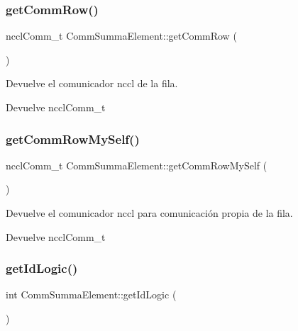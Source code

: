 \subsubsection{\texorpdfstring{get\+Comm\+Row()}{getCommRow()}}
{\footnotesize\ttfamily nccl\+Comm\+\_\+t Comm\+Summa\+Element\+::get\+Comm\+Row (\begin{DoxyParamCaption}{ }\end{DoxyParamCaption})}



Devuelve el comunicador nccl de la fila. 

\begin{DoxyReturn}{Devuelve}
nccl\+Comm\+\_\+t 
\end{DoxyReturn}
\mbox{\label{classCommSummaElement_a1fc217055366930113af68024e634f83}} 
\subsubsection{\texorpdfstring{get\+Comm\+Row\+My\+Self()}{getCommRowMySelf()}}
{\footnotesize\ttfamily nccl\+Comm\+\_\+t Comm\+Summa\+Element\+::get\+Comm\+Row\+My\+Self (\begin{DoxyParamCaption}{ }\end{DoxyParamCaption})}



Devuelve el comunicador nccl para comunicación propia de la fila. 

\begin{DoxyReturn}{Devuelve}
nccl\+Comm\+\_\+t 
\end{DoxyReturn}
\mbox{\label{classCommSummaElement_a1bd393be15ce4d1336dd8b34519a7e33}} 
\subsubsection{\texorpdfstring{get\+Id\+Logic()}{getIdLogic()}}
{\footnotesize\ttfamily int Comm\+Summa\+Element\+::get\+Id\+Logic (\begin{DoxyParamCaption}{ }\end{DoxyParamCaption})}



